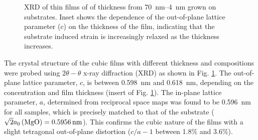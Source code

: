 \documentclass[reprint,aip,apl,floatfix,linenumbers,superscriptaddress]{revtex4-1}
\begin{document}
\begin{figure}
\caption{XRD of thin films of  of thickness from \SIrange{70}{4}{\nano\metre} grown on  substrates. Inset shows the dependence of the out-of-plane lattice parameter (c) on the thickness of the film, indicating that the substrate induced strain is increasingly relaxed as the thickness increases.}
\label{fig:xrd}
\end{figure}

The crystal structure of the cubic  films with different thickness and compositions were probed using $2\theta-\theta$ x-ray diffraction (XRD) as shown in Fig. \ref{fig:xrd}. The out-of-plane lattice parameter, $c$, is between \SI{0.598}{\nano\metre} and \SI{0.618}{\nano\metre}, depending on the  concentration and film thickness (insert of Fig. \ref{fig:xrd}). The in-plane lattice parameter, $a$, determined from reciprocal space maps was found to be \SI{0.596}{\nano\metre} for all samples, which is precisely matched to that of the  substrate ($\sqrt{2} a_0\left(\ce{MgO} \right) = \SI{0.5956}{\nano\metre}$). This confirms the cubic nature of the  films with a slight tetragonal out-of-plane distortion ($c/a-1$ between \num{1.8}\% and \num{3.6}\%).
\end{document}
